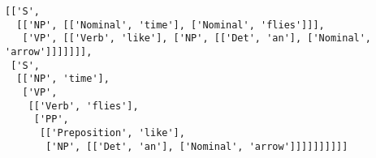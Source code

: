 \documentclass[12pt,a4paper,table]{article}
\makeatletter
\newcommand{\boxspacing}{\kern\kvtcb@left@rule\kern\kvtcb@boxsep}
\newcommand{\prompt}[4]{
        {\ttfamily\llap{{\color{#2}[#3]:\hspace{3pt}#4}}\vspace{-\baselineskip}}
    }
\makeatother
\begin{document}
    \begin{Verbatim}[commandchars=\\\{\}]
[['S',
  [['NP', [['Nominal', 'time'], ['Nominal', 'flies']]],
   ['VP', [['Verb', 'like'], ['NP', [['Det', 'an'], ['Nominal', 'arrow']]]]]]],
 ['S',
  [['NP', 'time'],
   ['VP',
    [['Verb', 'flies'],
     ['PP',
      [['Preposition', 'like'],
       ['NP', [['Det', 'an'], ['Nominal', 'arrow']]]]]]]]]]
    \end{Verbatim}




        
\end{document}
